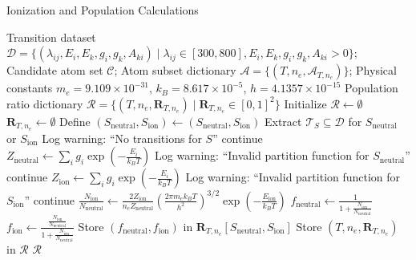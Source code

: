 \begin{algorithm}
\small
\caption{Ionization and Population Calculations}
\begin{algorithmic}[1]
  \REQUIRE Transition dataset $\mathcal{D} = \{ (\lambda_{ij}, E_i, E_k, g_i, g_k, A_{ki}) \mid \lambda_{ij} \in [300, 800], E_i, E_k, g_i, g_k, A_{ki} > 0 \}$; Candidate atom set $\mathcal{C}$; Atom subset dictionary $\mathcal{A} = \{ (T, n_e, \mathcal{A}_{T,n_e}) \}$; Physical constants $m_e = 9.109 \times 10^{-31}$, $k_B = 8.617 \times 10^{-5}$, $h = 4.1357 \times 10^{-15}$
  \ENSURE Population ratio dictionary $\mathcal{R} = \{ (T, n_e, \mathbf{R}_{T,n_e}) \mid \mathbf{R}_{T,n_e} \in [0, 1]^2 \}$
  \STATE Initialize $\mathcal{R} \gets \emptyset$ 
    \STATE $\mathbf{R}_{T,n_e} \gets \emptyset$ 
      \STATE Define $(S_{\text{neutral}}, S_{\text{ion}}) \gets (S_{\text{neutral}}, S_{\text{ion}})$ 
      \STATE Extract $\mathcal{T}_S \subseteq \mathcal{D}$ for $S_{\text{neutral}}$ or $S_{\text{ion}}$ 
        \STATE Log warning: ``No transitions for $S$'' 
        \STATE continue
      \ENDIF
      \STATE $Z_{\text{neutral}} \gets \sum_i g_i \exp\left(-\frac{E_i}{k_B T}\right)$ 
        \STATE Log warning: ``Invalid partition function for $S_{\text{neutral}}$'' 
        \STATE continue
      \ENDIF
      \STATE $Z_{\text{ion}} \gets \sum_i g_i \exp\left(-\frac{E_i}{k_B T}\right)$ 
        \STATE Log warning: ``Invalid partition function for $S_{\text{ion}}$'' 
        \STATE continue
      \ENDIF
      \STATE $\frac{N_{\text{ion}}}{N_{\text{neutral}}} \gets \frac{2 Z_{\text{ion}}}{n_e Z_{\text{neutral}}} \left( \frac{2\pi m_e k_B T}{h^2} \right)^{3/2} \exp\left(-\frac{E_{\text{ion}}}{k_B T}\right)$ 
      \STATE $f_{\text{neutral}} \gets \frac{1}{1 + \frac{N_{\text{ion}}}{N_{\text{neutral}}}}$ 
      \STATE $f_{\text{ion}} \gets \frac{\frac{N_{\text{ion}}}{N_{\text{neutral}}}}{1 + \frac{N_{\text{ion}}}{N_{\text{neutral}}}}$ 
      \STATE Store $(f_{\text{neutral}}, f_{\text{ion}})$ in $\mathbf{R}_{T,n_e}[S_{\text{neutral}}, S_{\text{ion}}]$ 
    \ENDFOR
    \STATE Store $(T, n_e, \mathbf{R}_{T,n_e})$ in $\mathcal{R}$ 
  \ENDFOR
  \STATE \RETURN $\mathcal{R}$ 
\end{algorithmic}
\end{algorithm}

